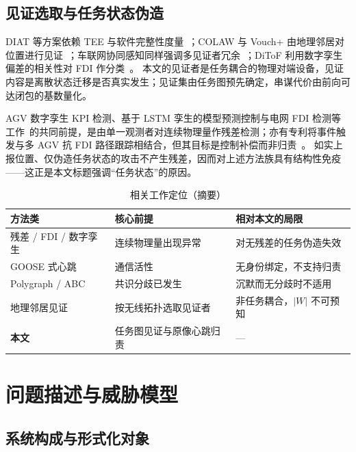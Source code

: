 \documentclass[manuscript,screen,review]{acmart}
\begin{document}
\subsection{见证选取与任务状态伪造}

DIAT 等方案依赖 TEE 与软件完整性度量~\cite{diat2019}；COLAW 与 Vouch+ 由地理邻居对位置进行见证~\cite{colaw2020,vouch2019}；车联网协同感知同样强调多见证者冗余~\cite{etsi460}；DiToF 利用数字孪生偏差的相关性对 FDI 作分类~\cite{ditof2024}。
本文的见证者是任务耦合的物理对端设备，见证内容是离散状态迁移是否真实发生；见证集由任务图预先确定，串谋代价由前向可达闭包的基数量化。

AGV 数字孪生 KPI 检测、基于 LSTM 孪生的模型预测控制与电网 FDI 检测等工作~\cite{dtmpc2025,agvkpi2022,fdi2024frontiers}的共同前提，是由单一观测者对连续物理量作残差检测；亦有专利将事件触发与多 AGV 抗 FDI 路径跟踪相结合，但其目标是控制补偿而非归责~\cite{cn120578205b}。
如实上报位置、仅伪造任务状态的攻击不产生残差，因而对上述方法族具有结构性免疫——这正是本文标题强调``任务状态''的原因。

\begin{table}[t]
  \centering
  \caption{相关工作定位（摘要）}
  \label{tab:rw}
  \begin{tabular}{@{}llp{}@{}}
    \toprule
    方法类 & 核心前提 & 相对本文的局限 \\
    \midrule
    残差 / FDI / 数字孪生 & 连续物理量出现异常 & 对无残差的任务伪造失效 \\
    GOOSE 式心跳 & 通信活性 & 无身份绑定，不支持归责 \\
    Polygraph / ABC & 共识分歧已发生 & 沉默而无分歧时不适用 \\
    地理邻居见证 & 按无线拓扑选取见证者 & 非任务耦合，$|W|$ 不可预知 \\
    \textbf{本文} & 任务图见证与原像心跳归责 & --- \\
    \bottomrule
  \end{tabular}
\end{table}

\section{问题描述与威胁模型}
\label{sec:model}

\subsection{系统构成与形式化对象}
\label{sec:sys}
\end{document}

